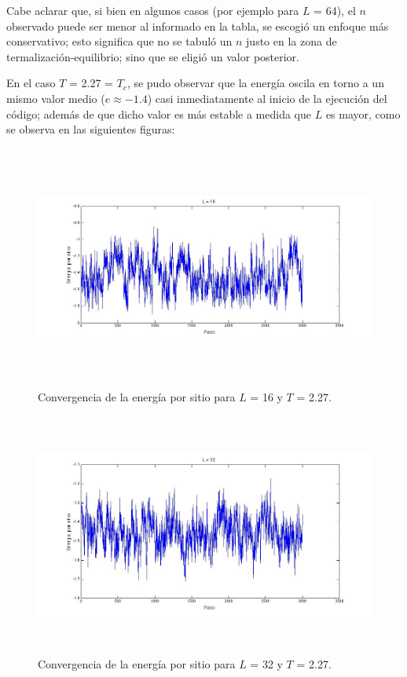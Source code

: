 \documentclass[a4paper,12pt]{article}
\begin{document}
Cabe aclarar que, si bien en algunos casos (por ejemplo para $L$ = 64), el $n$ observado puede ser menor al informado en la tabla, se escogi\'o un enfoque m\'as conservativo; esto significa que no se tabul\'o un $n$ justo en la zona de termalizaci\'on-equilibrio; sino que se eligi\'o un valor posterior.

En el caso $T$ = 2.27 = $T_{c}$, se pudo observar que la energ\'ia oscila en torno a un mismo valor medio ($e \approx -1.4$) casi inmediatamente al inicio de la ejecuci\'on del c\'odigo; adem\'as de que dicho valor es m\'as estable a medida que $L$ es mayor, como se observa en las siguientes figuras:

\begin{figure}[H]
\begin{center}
\includegraphics[height=8cm]{../graficos/En_L16_T227.jpg}
\caption[width=5cm]{Convergencia de la energ\'ia por sitio para $L$ = 16 y $T$ = 2.27.}
\end{center}
\end{figure}

\begin{figure}[H]
\begin{center}
\includegraphics[height=8cm]{../graficos/En_L32_T227.jpg}
\caption[width=5cm]{Convergencia de la energ\'ia por sitio para $L$ = 32 y $T$ = 2.27.}
\end{center}
\end{figure}
\end{document}
